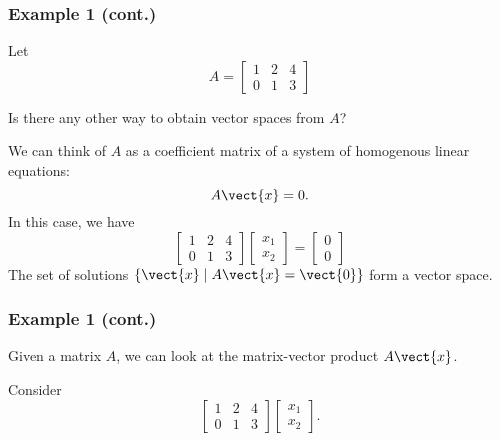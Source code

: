 \begin{frame}
  \frametitle{Example 1 (cont.)}

  Let
  \[
  A =
  \begin{bmatrix}
    1 & 2 & 4 \\
    0 & 1 & 3
  \end{bmatrix}
  \]

  Is there any other way to obtain vector spaces from $A$?  \pause

  \vspace{0.2in}

  We can think of $A$ as a coefficient matrix of a system of
  homogenous linear equations:
  \[
  A\vect{x} = 0.
  \]
  In this case, we have
  \[
  \begin{bmatrix}
    1 & 2 & 4 \\
    0 & 1 & 3
  \end{bmatrix}
  \begin{bmatrix}
    x_1\\ x_2
  \end{bmatrix}
  =
  \begin{bmatrix}
    0\\ 0
  \end{bmatrix}
  \]
  \pause
  The set of solutions $\{\vect{x} \;|\; A\vect{x}=\vect{0} \}$ form a vector space.
\end{frame}

\begin{frame}
  \frametitle{Example 1 (cont.)}

  Given a matrix $A$, we can look at the matrix-vector product $A\vect{x}$.

  Consider
  \[
  \begin{bmatrix}
    1 & 2 & 4 \\
    0 & 1 & 3
  \end{bmatrix}
  \begin{bmatrix}
    x_1\\ x_2
  \end{bmatrix}.
  \]

  \vspace{2in}
\end{frame}

